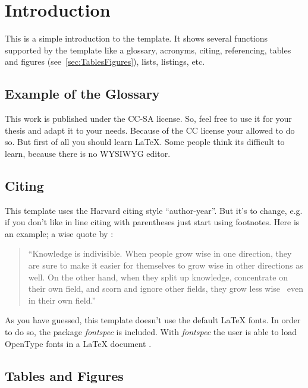 
\chapter{Introduction}
\label{cha:Introduction}

This is a simple introduction to the template. It shows several functions supported by the template like a glossary, acronyms, citing, referencing, tables and figures (see~\autoref{sec:TablesFigures}), lists, listings, etc.

\section{Example of the Glossary}
\label{sec:ExGlossary}

This work is published under the \gls{CC-SA} license. So, feel free to use it for your thesis and adapt it to your needs. Because of the \ac{CC} license your allowed to do so. But first of all you should learn {\LaTeX}. Some people think its difficult to learn, because there is no \ac{WYSIWYG} editor.


\section{Citing}
\label{sec:Citing}

This template uses the Harvard citing style \enquote{author-year}. But it's to change, e.g. if you don't like in line citing with parentheses just start using footnotes. Here is an example; a wise quote by \textcite{Asimov1997}:

\begin{quote}
\enquote{Knowledge is indivisible. When people grow wise in one direction, they are sure to make it easier for themselves to grow wise in other directions as well. On the other hand, when they split up knowledge, concentrate on their own field, and scorn and ignore other fields, they grow less wise \textemdash\ even in their own field.}
\end{quote}

As you have guessed, this template doesn't use the default {\LaTeX} fonts. In order to do so, the package \emph{fontspec} is included. With \emph{fontspec} the user is able to load OpenType fonts in a {\LaTeX} document \autocite[cf.][3]{Robertson2013}.

\section{Tables and Figures}
\label{sec:TablesFigures}

